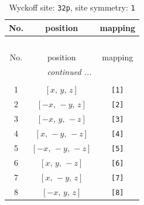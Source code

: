 \documentclass[fleqn,8pt]{jsarticle}
\begin{document}
\renewcommand{\arraystretch}{1.2}
\begin{longtable}{ccc}
\caption{Wyckoff site: {\tt 32p}, site symmetry: {\tt 1}}
 \\
 \hline \hline
No. & position & mapping \\ \hline \endfirsthead

\multicolumn{2}{l}{\tablename\ \thetable{}} \\
 \hline \hline
No. & position & mapping \\ \hline \endhead

 \hline \hline
\multicolumn{2}{r}{\footnotesize\it continued ...} \\ \endfoot

 \hline \hline
\multicolumn{2}{r}{} \\ \endlastfoot

1 & $\left[ x,\, y,\, z \right]$ & {\tt [1]} \\ \hline
2 & $\left[ - x,\, - y,\, z \right]$ & {\tt [2]} \\ \hline
3 & $\left[ - x,\, y,\, - z \right]$ & {\tt [3]} \\ \hline
4 & $\left[ x,\, - y,\, - z \right]$ & {\tt [4]} \\ \hline
5 & $\left[ - x,\, - y,\, - z \right]$ & {\tt [5]} \\ \hline
6 & $\left[ x,\, y,\, - z \right]$ & {\tt [6]} \\ \hline
7 & $\left[ x,\, - y,\, z \right]$ & {\tt [7]} \\ \hline
8 & $\left[ - x,\, y,\, z \right]$ & {\tt [8]} \\
\end{longtable}
\end{document}
